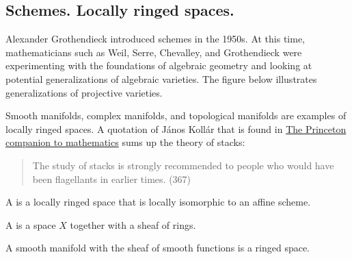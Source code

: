 \documentclass [11 pt, oneside] {article}
\begin{document}
\subsection{Schemes. Locally ringed spaces.}
Alexander Grothendieck introduced schemes in the 1950s. At this time, mathematicians such as Weil, Serre, Chevalley, and Grothendieck were experimenting with the foundations of algebraic geometry and looking at potential generalizations of algebraic varieties. The figure below illustrates generalizations of projective varieties.
\begin{center}
\end{center}

Smooth manifolds, complex manifolds, and topological manifolds are examples of locally ringed spaces.
A quotation of János Kollár that is found in \ul{The Princeton companion to mathematics} sums up the theory of stacks: 
\begin{quote}
	\small 
	The study of stacks is strongly recommended to people who would have been flagellants in earlier times. (367)
\end{quote}

\begin{definition}[ ]\label{}\text{}
A  is a locally ringed space that is locally isomorphic to an affine scheme.
\end{definition}

\begin{definition}[ ]\label{}\text{}
A  is a space $X$ together with a sheaf of rings.
\end{definition}

\begin{example}\label{}\text{}
	A smooth manifold with the sheaf of smooth functions is a ringed space.
\end{example}
\end{document}

